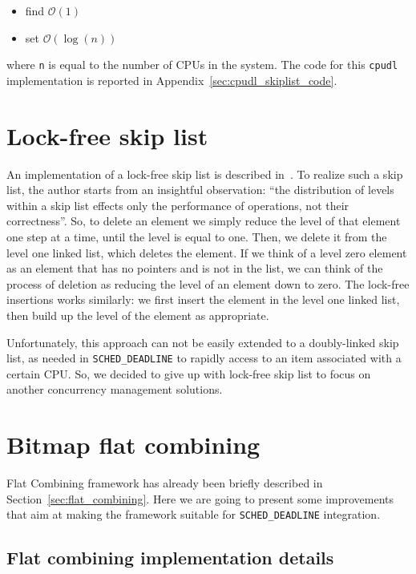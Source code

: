 \begin{itemize}
\item find $\mathcal{O}(1)$
\item set $\mathcal{O}(\log(n))$
\end{itemize}

\noindent where \texttt{n} is equal to the number of CPUs in the system.
The code for this \texttt{cpudl} implementation is reported in
Appendix~\ref{sec:cpudl_skiplist_code}.

\section{Lock-free skip list\label{sec:lock_free_skiplist}}

An implementation of a lock-free skip list is described in~\cite{Pugh1990}.
To realize such a skip list, the author starts from an insightful observation:
``the distribution of levels within a skip list effects only the performance
of operations, not their correctness''. So, to delete an element we simply
reduce the level of that element one step at a time, until the level is equal to one.
Then, we delete it from the level one linked list, which deletes the
element. If we think of a level zero element as an element that has no pointers
and is not in the list, we can think of the process of deletion as reducing
the level of an element down to zero. The lock-free insertions works similarly:
we first insert the element in the level one linked list, then build up the level
of the element as appropriate.

Unfortunately, this approach can not be easily extended to a doubly-linked skip list,
as needed in \texttt{SCHED\_DEADLINE} to rapidly access to an item associated
with a certain CPU. So, we decided to give up with lock-free skip list to
focus on another concurrency management solutions.

\section{Bitmap flat combining\label{sec:bitmap_flat_combining}}

Flat Combining framework has already been briefly described in 
Section~\ref{sec:flat_combining}.
Here we are going to present some improvements that aim at making the framework
suitable for \texttt{SCHED\_DEADLINE} integration.

\subsection{Flat combining implementation details\label{sec:flat_combining_details}}

